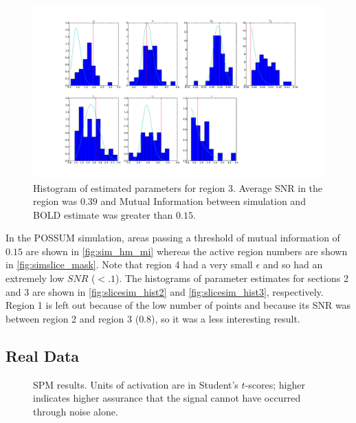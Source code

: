 \documentclass[journal]{./IEEEtran}
\begin{document}
\begin{figure}[!t] %
\centering
\includegraphics[clip=true,trim=2.5cm 2cm 2cm 1cm,width=15cm]{sec3hist}
\caption{Histogram of estimated parameters for region 3. Average SNR in the 
region was 
$0.39$ and Mutual Information between simulation and BOLD estimate was greater 
than $0.15$.}
\label{fig:slicesim_hist3}
\end{figure}

In the POSSUM simulation, areas passing a threshold of
mutual information of $0.15$  are shown in 
\autoref{fig:sim_hm_mi}
whereas the active region numbers are shown in 
\autoref{fig:simslice_mask}.
Note that region 4 had a very small $\epsilon$ and so
had an extremely low $SNR$ ($<.1$). The histograms of parameter
estimates for sections
2 and 3 are shown in \autoref{fig:slicesim_hist2} and 
\autoref{fig:slicesim_hist3}, respectively. Region 1 is
left out because of the low number of points and because
its SNR was between region 2 and region 3 ($0.8$), so it
was a less interesting result.

\subsection{Real Data}
\begin{figure}
\centering
{}
\caption{SPM results. Units of activation are in Student's $t$-scores; higher indicates higher
        assurance that the signal cannot have occurred through noise alone.}
\label{fig:hm_canon_spm}
\end{figure}
\end{document}
